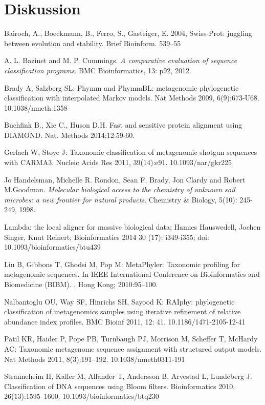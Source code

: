 \documentclass[10pt, a4paper]{article}[08.12.2015]
\begin{document}
  \section{Diskussion}
    \newpage
    \newpage
    \begin{thebibliography}{11}
    
	  Bairoch, A., Boeckmann, B., Ferro, S., Gasteiger, E. 2004, Swiss-Prot: 		  juggling between evolution and stability. Brief Bioinform. 539–55
	  
	  A. L. Bazinet and M. P. Cummings. \textit{A comparative evaluation of 		  sequence classification programs}. BMC Bioinformatics, 13: p92, 2012.
	  
	  Brady A, Salzberg SL: Phymm and PhymmBL: metagenomic phylogenetic 			  classification with interpolated Markov models. Nat Methods 2009, 			  6(9):673-U68. 10.1038/nmeth.1358
	  
      Buchfink B., Xie C., Huson D.H.
	  Fast and sensitive protein alignment using DIAMOND. Nat. Methods 				  2014;12:59-60.
	  
	  Gerlach W, Stoye J: Taxonomic classification of metagenomic shotgun 			  sequences with CARMA3. Nucleic Acids Res 2011, 39(14):e91. 					  10.1093/nar/gkr225
  
      Jo Handelsman, Michelle R. Rondon, Sean F. Brady, Jon Clardy and Robert   	  M.Goodman. \textit{Molecular biological access to the chemistry of 			  unknown soil microbes: a new frontier for natural products}. Chemistry \& 	  Biology, 5(10): 245-249, 1998.
      
      Lambda: the local aligner for massive biological data; Hannes Hauswedell, 	  Jochen Singer, Knut Reinert; Bioinformatics 2014 30 (17): i349-i355; doi: 	  10.1093/bioinformatics/btu439
      
	  Liu B, Gibbons T, Ghodsi M, Pop M: MetaPhyler: Taxonomic profiling for 		  metagenomic sequences. In IEEE International Conference on Bioinformatics 	  and Biomedicine (BIBM). , Hong Kong; 2010:95–100.
	  
	  Nalbantoglu OU, Way SF, Hinrichs SH, Sayood K: RAIphy: phylogenetic 			  classification of metagenomics samples using iterative refinement of 			  relative abundance index profiles. BMC Bioinf 2011, 12: 41. 					  10.1186/1471-2105-12-41
	  
	  Patil KR, Haider P, Pope PB, Turnbaugh PJ, Morrison M, Scheffer T, 			  McHardy AC: Taxonomic metagenome sequence assignment with structured 			  output models. Nat Methods 2011, 8(3):191–192. 10.1038/nmeth0311-191
		 
	  
	  Stranneheim H, Kaller M, Allander T, Andersson B, Arvestad L, Lundeberg 		  J: Classification of DNA sequences using Bloom filters. Bioinformatics 		  2010, 26(13):1595–1600. 10.1093/bioinformatics/btq230
	  
	  

    \end{thebibliography}
\end{document}
